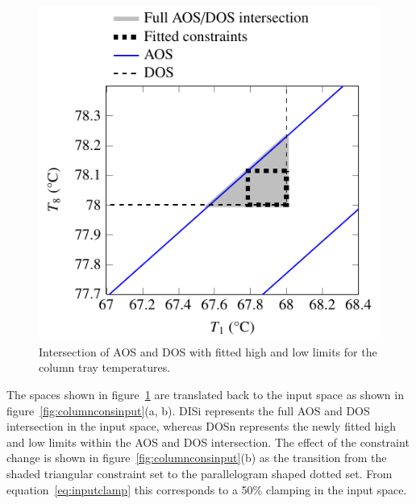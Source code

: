 \documentclass[final,authoryear,5pt,times,twocolumn]{elsarticle}
\begin{document}
\begin{figure}[htbp]
  \centering
    \includegraphics{figure3.pdf}
  \caption[Fitted constraints for the laboratory distillation column]{Intersection of AOS and DOS with fitted high and low limits for the column tray temperatures.}
  \label{fig:columnfitbox}
\end{figure}

The spaces shown in figure~\ref{fig:columnfitbox} are translated back to the input space as shown in figure~\ref{fig:columnconsinput}(a, b).
DISi represents the full AOS and DOS intersection in the input space, whereas DOSn represents the newly fitted high and low limits within the AOS and DOS intersection.
The effect of the constraint change is shown in figure~\ref{fig:columnconsinput}(b) as the transition from the shaded triangular constraint set to the parallelogram shaped dotted set.
From equation~\ref{eq:inputclamp} this corresponds to a 50\% clamping in the input space.
\end{document}
